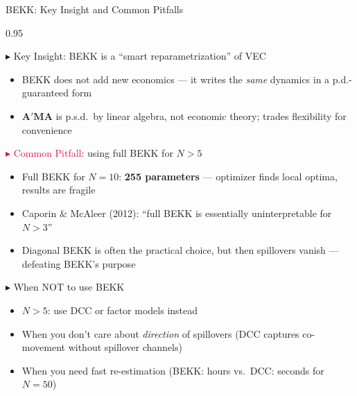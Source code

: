 \documentclass[9pt, aspectratio=169, t]{beamer}
\begin{document}
\begin{frame}{BEKK: Key Insight and Common Pitfalls}
    \begin{cminipage}{0.95\textwidth}
    \vspace{-4mm}
    {\scriptsize
    \begin{block}{\textcolor{MainBlue}{$\blacktriangleright$ Key Insight}: BEKK is a ``smart reparametrization'' of VEC}
        \begin{itemize}\setlength{\itemsep}{0pt}
            \item BEKK does not add new economics --- it writes the \textit{same} dynamics in a p.d.-guaranteed form
            \item $\mathbf{A}'\mathbf{M}\mathbf{A}$ is p.s.d.\ by linear algebra, not economic theory; trades flexibility for convenience
        \end{itemize}
    \end{block}
    \vspace{-2mm}
    \begin{alertblock}{\textcolor{Crimson}{$\blacktriangleright$ Common Pitfall}: using full BEKK for $N > 5$}
        \begin{itemize}\setlength{\itemsep}{0pt}
            \item Full BEKK for $N = 10$: \textbf{255 parameters} --- optimizer finds local optima, results are fragile
            \item Caporin \& McAleer (2012): ``full BEKK is essentially uninterpretable for $N > 3$''
            \item Diagonal BEKK is often the practical choice, but then spillovers vanish --- defeating BEKK's purpose
        \end{itemize}
    \end{alertblock}
    \vspace{-2mm}
    \begin{exampleblock}{\textcolor{Forest}{$\blacktriangleright$ When NOT to use BEKK}}
        \begin{itemize}\setlength{\itemsep}{0pt}
            \item $N > 5$: use DCC or factor models instead
            \item When you don't care about \textit{direction} of spillovers (DCC captures co-movement without spillover channels)
            \item When you need fast re-estimation (BEKK: hours vs.\ DCC: seconds for $N = 50$)
        \end{itemize}
    \end{exampleblock}
    }
    \end{cminipage}
\end{frame}
\end{document}
